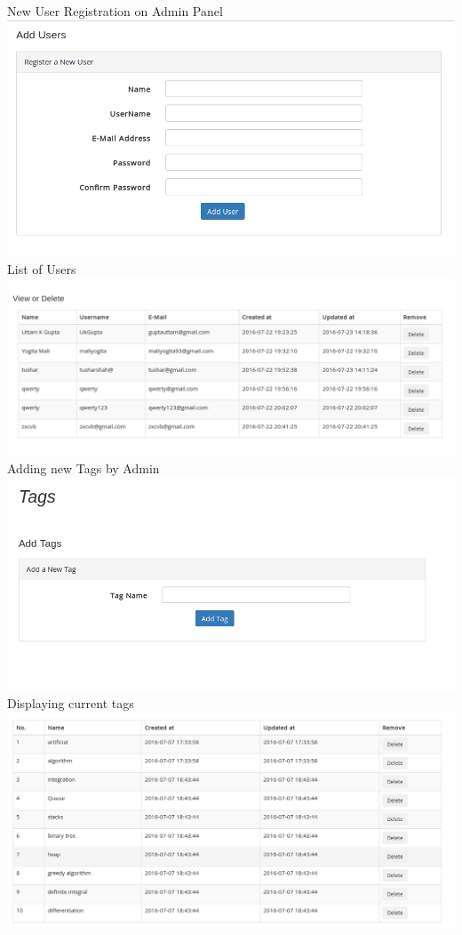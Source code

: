 \documentclass[a4paper,12pt,oneside]{book}
\begin{document}
New User Registration on Admin Panel \\
\includegraphics[scale=0.45]{user.png}	\\

\vspace{0.7in}
List of Users \\
\includegraphics[scale=0.35]{user2.png}	\\

\vspace{1in}
Adding new Tags by Admin\\
\includegraphics[scale=0.45]{tags.png}	\\

\vspace{2in}
Displaying current tags \\
\includegraphics[scale=0.3]{tags2.png}	\\
\end{document}
